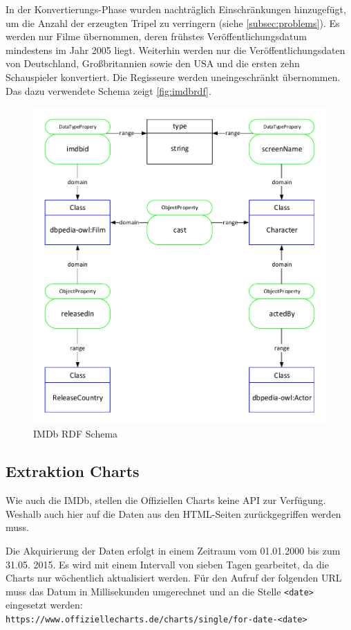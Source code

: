 \documentclass[parskip]{scrartcl}
\begin{document}
In der Konvertierungs-Phase wurden nachträglich Einschränkungen hinzugefügt, um die Anzahl der erzeugten Tripel zu verringern (siehe \ref{subsec:problems}). Es werden nur Filme übernommen, deren frühstes Veröffentlichungsdatum mindestens im Jahr 2005 liegt. Weiterhin werden nur die Veröffentlichungsdaten von Deutschland, Großbritannien sowie den USA und die ersten zehn Schauspieler konvertiert. Die Regisseure werden uneingeschränkt übernommen. Das dazu verwendete Schema zeigt \autoref{fig:imdbrdf}.

\begin{figure}[H]
    \centering
    \caption{IMDb RDF Schema}
    \label{fig:imdbrdf}
    \includegraphics[scale=0.8]{imdb}
\end{figure}

\subsection{Extraktion Charts}

Wie auch die IMDb, stellen die Offiziellen Charts keine API zur Verfügung. Weshalb auch hier auf die Daten aus den HTML-Seiten zurückgegriffen werden muss.

Die Akquirierung der Daten erfolgt in einem Zeitraum vom 01.01.2000 bis zum 31.05. 2015. Es wird mit einem Intervall von sieben Tagen gearbeitet, da die Charts nur wöchentlich aktualisiert werden. Für den Aufruf der folgenden URL muss das Datum in Millisekunden umgerechnet und an die Stelle \texttt{<date>} eingesetzt werden:\\
\texttt{https://www.offiziellecharts.de/charts/single/for-date-<date>}
\end{document}
